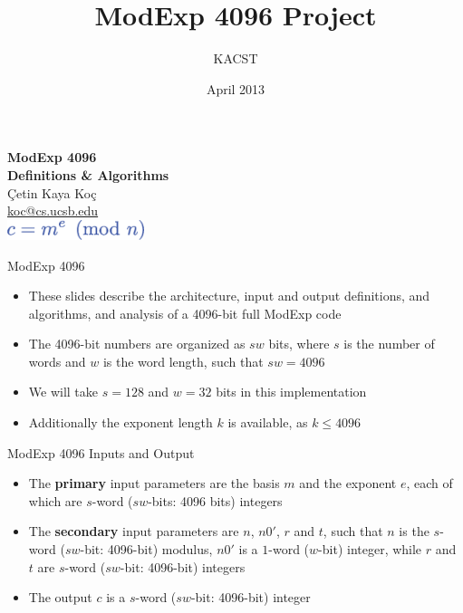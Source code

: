 \documentclass[xcolor=dvipsnames]{beamer}
\author{KACST}
\institute{}
\title{ModExp 4096 Project}
\date{April 2013}
\begin{document}
\begin{frame}
\begin{center}
\textbf{\Large ModExp 4096 \\[0.5em]
Definitions \& Algorithms}  \\[2em]
\c{C}etin Kaya Ko\c{c}  \\
\url{koc@cs.ucsb.edu} \\[3em]
\includegraphics[width=4cm]{cme.eps}
\end{center}
\end{frame}

\begin{frame}{ModExp 4096}
\begin{itemize}

\item These slides describe the architecture, input and output definitions, and
algorithms, and analysis of a 4096-bit full ModExp code

\item The 4096-bit numbers are organized as $sw$ bits, where $s$ is the number
of words and $w$ is the word length, such that $sw=4096$

\medskip

\item We will take $s=128$ and $w=32$ bits in this implementation

\item Additionally the exponent length $k$ is available, as $k \leq 4096$

\end{itemize}
\end{frame}

\begin{frame}{ModExp 4096 Inputs and Output}
\begin{itemize}

\item The \textbf{primary} input parameters are the basis $m$ and the exponent $e$, 
each of which are $s$-word ($sw$-bits: 4096 bits) integers

\medskip

\item The \textbf{secondary} input parameters are $n$, $n0'$, $r$ and $t$, such that
$n$ is the $s$-word ($sw$-bit: 4096-bit) modulus, $n0'$ is a $1$-word ($w$-bit) 
integer, while $r$ and $t$ are $s$-word ($sw$-bit: 4096-bit) integers

\medskip

\item The output $c$ is a $s$-word ($sw$-bit: 4096-bit) integer

\end{itemize}
\end{frame}
\end{document}
